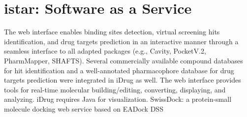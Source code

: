 \chapter{istar: Software as a Service}

\citep{1396} The web interface enables binding sites detection, virtual screening hits identification, and drug targets prediction in an interactive manner through a seamless interface to all adapted packages (e.g., Cavity, PocketV.2, PharmMapper, SHAFTS). Several commercially available compound databases for hit identification and a well-annotated pharmacophore database for drug targets prediction were integrated in iDrug as well. The web interface provides tools for real-time molecular building/editing, converting, displaying, and analyzing.
\citep{1396} iDrug requires Java for visualization.
\citep{1425} SwissDock: a protein-small molecule docking web service based on EADock DSS

\chapterend
